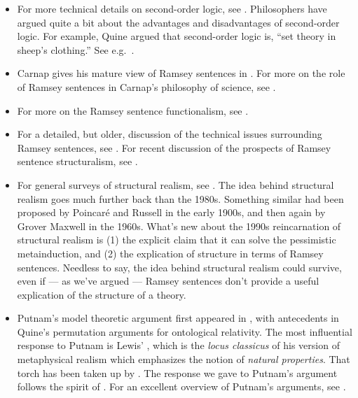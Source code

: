 \begin{itemize}
  \item For more technical details on second-order logic, see
  \cite{shapiro,manzano-book}.  Philosophers have argued quite a bit
  about the advantages and disadvantages of second-order logic.  For
  example, Quine argued that second-order logic is, ``set theory in
  sheep's clothing.''  See e.g.\ \cite{bueno}.
\item Carnap gives his mature view of Ramsey sentences in
  \citep{carnap-pfp}.  For more on the role of Ramsey sentences in
  Carnap's philosophy of science, see
  \cite{psillos2000,psillos2006,friedman2011,demo2013}.
\item For more on
  the Ramsey sentence functionalism, see \cite{shoemaker}.
\item For a detailed, but older, discussion of the technical issues
  surrounding Ramsey sentences, see \cite[][Chap.\ 3]{tuomela}.  For
  recent discussion of the prospects of Ramsey sentence structuralism,
  see \cite{ketland,melia,ainsworth,dew-ram}.
\item For general surveys of structural realism, see
  \cite{frigg2011,ladyman}.  The idea behind structural realism goes
  much further back than the 1980s.  Something similar had been
  proposed by Poincar\'e and Russell in the early 1900s, and then
  again by Grover Maxwell in the 1960s.  What's new about the 1990s
  reincarnation of structural realism is (1) the explicit claim that
  it can solve the pessimistic metainduction, and (2) the explication
  of structure in terms of Ramsey sentences.  Needless to say, the
  idea behind structural realism could survive, even if --- as we've
  argued --- Ramsey sentences don't provide a useful explication of
  the structure of a theory.
\item Putnam's model theoretic argument first appeared in
  \cite{putnam1977,putnam-models}, with antecedents in Quine's
  permutation arguments for ontological relativity.  The most
  influential response to Putnam is Lewis' \citeyearpar{lewis-putnam},
  which is the {\it locus classicus} of his version of metaphysical
  realism which emphasizes the notion of {\it natural properties}.
  That torch has been taken up by \cite{sider2013}.  The response we
  gave to Putnam's argument follows the spirit of \cite{bas-putnam}.
  For an excellent overview of Putnam's arguments, see \cite{button}.
 \end{itemize}






